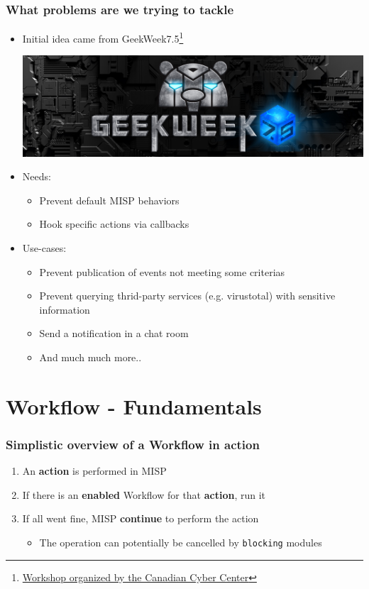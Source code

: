 \begin{frame}
    \frametitle{What problems are we trying to tackle}
    \begin{itemize}
        \item Initial idea came from GeekWeek7.5\footnote{\href{https://cyber.gc.ca/en/events/geekweek-75}{Workshop organized by the Canadian Cyber Center}}
        \begin{center}
            \includegraphics[width=0.3\linewidth]{pictures/geekweek75.jpg}
        \end{center}
        \item Needs:
        \begin{itemize}
            \item Prevent default MISP behaviors
            \item Hook specific actions via callbacks
        \end{itemize}
        \item Use-cases:
        \begin{itemize}
            \item Prevent publication of events not meeting some criterias
            \item Prevent querying thrid-party services (e.g. virustotal) with sensitive information
            \item Send a notification in a chat room
            \item And much much more..
        \end{itemize}
    \end{itemize}
\end{frame}

\section{Workflow - Fundamentals}
\begin{frame}
    \frametitle{Simplistic overview of a Workflow in action}
    \begin{enumerate}
        \item An \textbf{action} is performed in MISP
        \item If there is an \textbf{enabled} Workflow for that \textbf{action}, run it
        \item If all went fine, MISP \textbf{continue} to perform the action
        \begin{itemize}
            \item The operation can potentially be cancelled by \texttt{blocking} modules
        \end{itemize}
    \end{enumerate}
\end{frame}


